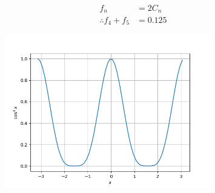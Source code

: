 \documentclass[journal,12pt,onecolumn]{IEEEtran}
\theoremstyle{remark}
\begin{document}
\begin{align}
f_n &= 2C_n \\
\therefore f_4 + f_5 &= 0.125
\end{align}
\begin{figure}[ht]
	\centering
	\includegraphics[width=0.8\textwidth]{./figs/fig1.png}
\end{figure}
\end{document}
